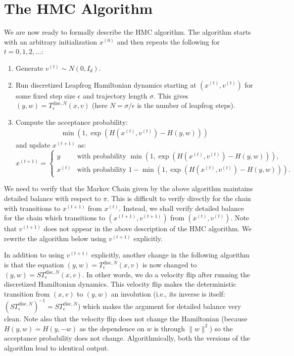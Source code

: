 \documentclass{scrartcl}
\begin{document}
\section{The HMC Algorithm}

We are now ready to formally describe the HMC algorithm. The algorithm
starts with an arbitrary initialization $x^{(0)}$ and then repeats the
following for $t = 0, 1, 2, \dots$:
\begin{enumerate}
\item Generate $v^{(t)} \sim N(0, I_d)$.
\item Run discretized Leapfrog Hamiltonian dynamics starting at
  $(x^{(t)}, v^{(t)})$ for some fixed step size $\epsilon$ and
  trajectory length $\sigma$. This gives $(y, w) =
  T_{\epsilon}^{\text{disc}, N}(x, v)$ (here $N = \sigma/\epsilon$ is
  the number of leapfrog steps).
\item Compute the acceptance probability: 
  \begin{align*}
    \min \left(1, \exp(H(x^{(t)}, v^{(t)}) - H(y, w)) \right)
  \end{align*}
  and update $x^{(t+1)}$ as:
  \[
x^{(t+1)} =
\begin{cases}
y & \text{with probability }     \min \left(1, \exp(H(x^{(t)},
     v^{(t)}) - H(y, w)) \right), \\[1em] 
x^{(t)} & \text{with probability } 1 - \min \left(1, \exp(H(x^{(t)},
     v^{(t)}) - H(y, w)) \right). 
\end{cases}
\]
\end{enumerate}
We need to verify that the Markov Chain given by the above algorithm
maintains detailed balance with respect to $\pi$. This is difficult to
verify directly for the chain with transitions to $x^{(t+1)}$ from
$x^{(t)}$. Instead, we shall verify detailed balance for the chain
which transitions to $(x^{(t+1)}, v^{(t+1)})$ from $(x^{(t)},
v^{(t)})$. Note that $v^{(t+1)}$ does not appear in the above
description of the HMC algorithm. We rewrite the algorithm below using
$v^{(t+1)}$ explicitly.

In addition to using $v^{(t+1)}$ explicitly, another change in the
following algorithm is that the equation $(y, w) =
T_{\epsilon}^{\text{disc}, N}(x, v)$ is now changed to $(y, w) = S
T_{\epsilon}^{\text{disc}, N}(x, v)$. In other words, we do a velocity
flip after running the discretized Hamiltonian dynamics. This velocity
flip makes the deterministic transition from $(x, v)$ to $(y, w)$ an
involution (i.e., its inverse is itself: $(S
T_{\epsilon}^{\text{disc}, N})^{-1} = S T_{\epsilon}^{\text{disc},
  N}$) which makes the argument for detailed balance very clean. Note
also that the velocity flip does not change the Hamiltonian (because
$H(y, w) = H(y, -w)$ as the dependence on $w$ is through $\|w\|^2$) so
the acceptance probability does not change. Algorithmically, both the
versions of the algorithm lead to identical output.
\end{document}
